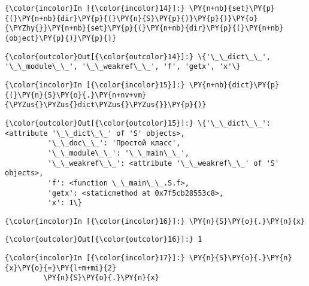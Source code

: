     \begin{Verbatim}[commandchars=\\\{\}]
{\color{incolor}In [{\color{incolor}14}]:} \PY{n+nb}{set}\PY{p}{(}\PY{n+nb}{dir}\PY{p}{(}\PY{n}{S}\PY{p}{)}\PY{p}{)}\PY{o}{\PYZhy{}}\PY{n+nb}{set}\PY{p}{(}\PY{n+nb}{dir}\PY{p}{(}\PY{n+nb}{object}\PY{p}{)}\PY{p}{)}
\end{Verbatim}

            \begin{Verbatim}[commandchars=\\\{\}]
{\color{outcolor}Out[{\color{outcolor}14}]:} \{'\_\_dict\_\_', '\_\_module\_\_', '\_\_weakref\_\_', 'f', 'getx', 'x'\}
\end{Verbatim}
        
    \begin{Verbatim}[commandchars=\\\{\}]
{\color{incolor}In [{\color{incolor}15}]:} \PY{n+nb}{dict}\PY{p}{(}\PY{n}{S}\PY{o}{.}\PY{n+nv+vm}{\PYZus{}\PYZus{}dict\PYZus{}\PYZus{}}\PY{p}{)}
\end{Verbatim}

            \begin{Verbatim}[commandchars=\\\{\}]
{\color{outcolor}Out[{\color{outcolor}15}]:} \{'\_\_dict\_\_': <attribute '\_\_dict\_\_' of 'S' objects>,
          '\_\_doc\_\_': 'Простой класс',
          '\_\_module\_\_': '\_\_main\_\_',
          '\_\_weakref\_\_': <attribute '\_\_weakref\_\_' of 'S' objects>,
          'f': <function \_\_main\_\_.S.f>,
          'getx': <staticmethod at 0x7f5cb28553c8>,
          'x': 1\}
\end{Verbatim}
        
    \begin{Verbatim}[commandchars=\\\{\}]
{\color{incolor}In [{\color{incolor}16}]:} \PY{n}{S}\PY{o}{.}\PY{n}{x}
\end{Verbatim}

            \begin{Verbatim}[commandchars=\\\{\}]
{\color{outcolor}Out[{\color{outcolor}16}]:} 1
\end{Verbatim}
        
    \begin{Verbatim}[commandchars=\\\{\}]
{\color{incolor}In [{\color{incolor}17}]:} \PY{n}{S}\PY{o}{.}\PY{n}{x}\PY{o}{=}\PY{l+m+mi}{2}
         \PY{n}{S}\PY{o}{.}\PY{n}{x}
\end{Verbatim}

